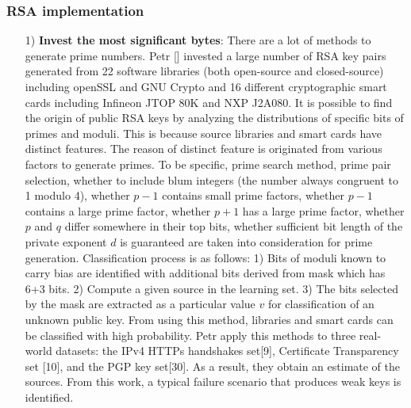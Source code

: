 \documentclass[a4paper]{article}
\begin{document}
\subsubsection{RSA implementation}
\begin{enumerate}[label=]
       \item[1)] \textbf{Invest the most significant bytes}: There are a lot of methods to generate prime numbers. Petr [] invested a large number of RSA key pairs generated from 22 software libraries (both open-source and closed-source) including openSSL and GNU Crypto and 16 different cryptographic smart cards including Infineon JTOP 80K and NXP J2A080. It is possible to find the origin of public RSA keys by analyzing the distributions of specific bits of primes and moduli. This is because source libraries and smart cards have distinct features. The reason of distinct feature is originated from various factors to generate primes. To be specific, prime search method, prime pair selection, whether to include blum integers (the number always congruent to 1 modulo 4), whether $p-1$ contains small prime factors, whether $p-1$ contains a large prime factor, whether $p+1$ has a large prime factor, whether $p$ and $q$ differ somewhere in their top bits, whether sufficient bit length of the private exponent $d$ is guaranteed are taken into consideration for prime generation. Classification process is as follows: 1) Bits of moduli known to carry bias are identified with additional bits derived from mask which has 6+3 bits. 2) Compute a given source in the learning set. 3) The bits selected by the mask are extracted as a particular value $v$ for classification of an unknown public key. From using this method, libraries and smart cards can be classified with high probability. Petr apply this methods to three real-world datasets: the IPv4 HTTPs handshakes set[9], Certificate Transparency set [10], and the PGP key set[30]. As a result, they obtain an estimate of the sources. From this work, a typical failure scenario that produces weak keys is identified. 
       

\end{enumerate}
\end{document}
